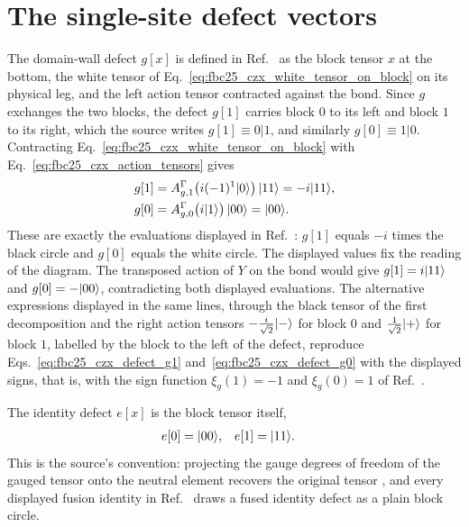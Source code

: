 \documentclass{article}
\begin{document}
\section{The single-site defect vectors}

The domain-wall defect $g[x]$ is defined in
Ref.~\cite[lines~2831--2845]{FrancoRubio2025MPUGauging} as the block tensor
$x$ at the bottom, the white tensor of
Eq.~\ref{eq:fbc25_czx_white_tensor_on_block} on its physical leg, and the
left action tensor contracted against the bond. Since $g$ exchanges the two
blocks, the defect $g[1]$ carries block $0$ to its left and block $1$ to its
right, which the source writes $g[1]\equiv0|1$, and similarly
$g[0]\equiv1|0$. Contracting Eq.~\ref{eq:fbc25_czx_white_tensor_on_block}
with Eq.~\ref{eq:fbc25_czx_action_tensors} gives
\begin{align}
    g[1]
        &=A^{\Gamma}_{g,1}\bigl(i(-1)^{1}|0\rangle\bigr)\,|11\rangle
        =-i|11\rangle,
    \label{eq:fbc25_czx_defect_g1}\\
    g[0]
        &=A^{\Gamma}_{g,0}\bigl(i|1\rangle\bigr)\,|00\rangle
        =|00\rangle.
    \label{eq:fbc25_czx_defect_g0}
\end{align}
These are exactly the evaluations displayed in
Ref.~\cite[lines~4800--4859]{FrancoRubio2025MPUGauging}: $g[1]$ equals $-i$
times the black circle and $g[0]$ equals the white circle. The displayed
values fix the reading of the diagram. The transposed action of $Y$ on the
bond would give $g[1]=i|11\rangle$ and $g[0]=-|00\rangle$, contradicting both
displayed evaluations. The alternative expressions displayed in the same
lines, through the black tensor of the first decomposition and the right
action tensors $-\tfrac{i}{\sqrt2}|-\rangle$ for block $0$ and
$\tfrac1{\sqrt2}|+\rangle$ for block $1$, labelled by the block to the left of
the defect, reproduce Eqs.~\ref{eq:fbc25_czx_defect_g1}
and~\ref{eq:fbc25_czx_defect_g0} with the displayed signs, that is, with
the sign function $\xi_g(1)=-1$ and $\xi_g(0)=1$ of
Ref.~\cite[lines~2925--2962]{FrancoRubio2025MPUGauging}.

The identity defect $e[x]$ is the block tensor itself,
\begin{align}
    e[0]&=|00\rangle,
    &
    e[1]&=|11\rangle.
    \label{eq:fbc25_czx_defect_e}
\end{align}
This is the source's convention: projecting the gauge degrees of freedom of
the gauged tensor onto the neutral element recovers the original tensor
\cite[lines~3494--3529]{FrancoRubio2025MPUGauging}, and every displayed
fusion identity in
Ref.~\cite[lines~4889--5066]{FrancoRubio2025MPUGauging} draws a fused
identity defect as a plain block circle.
\end{document}
